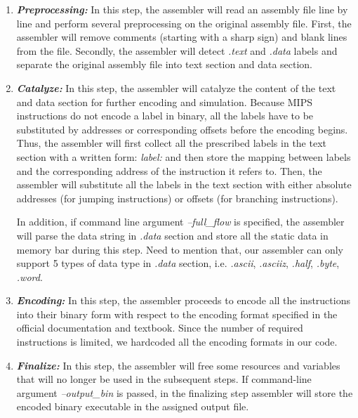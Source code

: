 \documentclass[conference, draftclsnofoot, letterpaper]{IEEETran}
\begin{document}
\begin{enumerate}[label=(\roman*)]\itemsep .5em
	\item \textit{\textbf{Preprocessing: }} In this step, the assembler will read an assembly file line by line and perform several preprocessing on the original assembly file. First, the assembler will remove comments (starting with a sharp sign) and blank lines from the file. Secondly, the assembler will detect \emph{.text} and \emph{.data} labels and separate the original assembly file into text section and data section. 
	
	\item \textit{\textbf{Catalyze:}} In this step, the assembler will catalyze the content of the text and data section for further encoding and simulation. Because MIPS instructions do not encode a label in binary, all the labels have to be substituted by addresses or corresponding offsets before the encoding begins. Thus, the assembler will first collect all the prescribed labels in the text section with a written form: \emph{label:} and then store the mapping between labels and the corresponding address of the instruction it refers to. Then, the assembler will substitute all the labels in the text section with either absolute addresses (for jumping instructions) or offsets (for branching instructions). 
	
	In addition, if command line argument \emph{--full\_flow} is specified, the assembler will parse the data string in \emph{.data} section and store all the static data in memory bar during this step. Need to mention that, our assembler can only support 5 types of data type in \emph{.data} section, i.e. \emph{.ascii}, \emph{.asciiz}, \emph{.half}, \emph{.byte}, \emph{.word}.
	
	\item \textit{\textbf{Encoding:}} In this step, the assembler proceeds to encode all the instructions into their binary form with respect to the encoding format specified in the official documentation and textbook. Since the number of required instructions is limited, we hardcoded all the encoding formats in our code.
	
	\item \textit{\textbf{Finalize:}} In this step, the assembler will free some resources and variables that will no longer be used in the subsequent steps. If command-line argument \emph{--output\_bin} is passed, in the finalizing step assembler will store the encoded binary executable in the assigned output file.
\end{enumerate}
\end{document}

